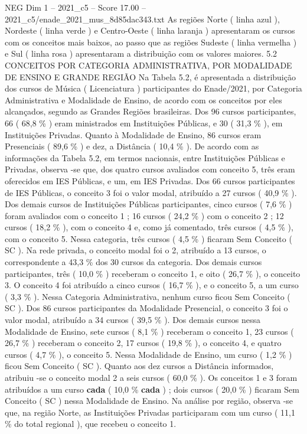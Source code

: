 \begin{textsample}{NEG Dim 1 – 2021\_c5 – Score 17.00 – 2021\_c5/enade\_2021\_mus\_8d85dac343.txt}
As regiões Norte ( linha azul ), Nordeste ( linha verde ) e Centro-Oeste ( linha laranja ) apresentaram os cursos com os conceitos mais baixos, ao passo que as regiões Sudeste ( linha vermelha ) e Sul ( linha rosa ) apresentaram a distribuição com os valores maiores. 5.2 CONCEITOS POR CATEGORIA ADMINISTRATIVA, POR MODALIDADE DE ENSINO E GRANDE REGIÃO Na Tabela 5.2, é apresentada a distribuição dos cursos de Música ( Licenciatura ) participantes do Enade/2021, por Categoria Administrativa e Modalidade de Ensino, de acordo com os conceitos por eles alcançados, segundo as Grandes Regiões brasileiras.
Dos 96 cursos participantes, 66 ( 68,8 \% ) eram ministrados em Instituições Públicas, e 30 ( 31,3 \% ), em Instituições Privadas.
Quanto à Modalidade de Ensino, 86 cursos eram Presenciais ( 89,6 \% ) e dez, a Distância ( 10,4 \% ).
De acordo com as informações da Tabela 5.2, em termos nacionais, entre Instituições Públicas e Privadas, observa -se que, dos quatro cursos avaliados com conceito 5, três eram oferecidos em IES Públicas, e um, em IES Privadas.
Dos 66 cursos participantes de IES Públicas, o conceito 3 foi o valor modal, atribuído a 27 cursos ( 40,9 \% ).
Dos demais cursos de Instituições Públicas participantes, cinco cursos ( 7,6 \% ) foram avaliados com o conceito 1 ; 16 cursos ( 24,2 \% ) com o conceito 2 ; 12 cursos ( 18,2 \% ), com o conceito 4 e, como já comentado, três cursos ( 4,5 \% ), com o conceito 5.
Nessa categoria, três cursos ( 4,5 \% ) ficaram Sem Conceito ( SC ).
Na rede privada, o conceito modal foi o 2, atribuído a 13 cursos, o correspondente a 43,3 \% dos 30 cursos da categoria.
Dos demais cursos participantes, três ( 10,0 \% ) receberam o conceito 1, e oito ( 26,7 \% ), o conceito 3.
O conceito 4 foi atribuído a cinco cursos ( 16,7 \% ), e o conceito 5, a um curso ( 3,3 \% ).
Nessa Categoria Administrativa, nenhum curso ficou Sem Conceito ( SC ).
Dos 86 cursos participantes da Modalidade Presencial, o conceito 3 foi o valor modal, atribuído a 34 cursos ( 39,5 \% ).
Dos demais cursos nessa Modalidade de Ensino, sete cursos ( 8,1 \% ) receberam o conceito 1, 23 cursos ( 26,7 \% ) receberam o conceito 2, 17 cursos ( 19,8 \% ), o conceito 4, e quatro cursos ( 4,7 \% ), o conceito 5.
Nessa Modalidade de Ensino, um curso ( 1,2 \% ) ficou Sem Conceito ( SC ).
Quanto aos dez cursos a Distância informados, atribuiu -se o conceito modal 2 a seis cursos ( 60,0 \% ).
Os conceitos 1 e 3 foram atribuídos a um curso \textbf{cada} ( 10,0 \% \textbf{cada} ) ; dois cursos ( 20,0 \% ) ficaram Sem Conceito ( SC ) nessa Modalidade de Ensino.
Na análise por região, observa -se que, na região Norte, as Instituições Privadas participaram com um curso ( 11,1 \% do total regional ), que recebeu o conceito 1.

\end{textsample}
